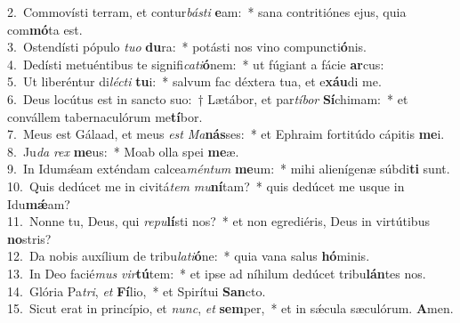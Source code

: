 {2.~}Commovísti terram, et contur\textit{bá}\textit{sti} \textbf{e}am:~* sana contritiónes ejus, quia com\textbf{mó}ta est.\\
{3.~}Ostendísti pópulo \textit{tu}\textit{o} \textbf{du}ra:~* potásti nos vino compuncti\textbf{ó}nis.\\
{4.~}Dedísti metuéntibus te signifi\textit{ca}\textit{ti}\textbf{ó}nem:~* ut fúgiant a fácie \textbf{ar}cus:\\
{5.~}Ut liberéntur di\textit{lé}\textit{cti} \textbf{tu}i:~* salvum fac déxtera tua, et e\textbf{xáu}di me.\\
{6.~}Deus locútus est in sancto suo:~† Lætábor, et par\textit{tí}\textit{bor} \textbf{Sí}chimam:~* et convállem tabernaculórum me\textbf{tí}bor.\\
{7.~}Meus est Gálaad, et meus \textit{est} \textit{Ma}\textbf{nás}ses:~* et Ephraim fortitúdo cápitis \textbf{me}i.\\
{8.~}Ju\textit{da} \textit{rex} \textbf{me}us:~* Moab olla spei \textbf{me}æ.\\
{9.~}In Idumǽam exténdam calcea\textit{mén}\textit{tum} \textbf{me}um:~* mihi alienígenæ súbdi\textbf{ti} sunt.\\
{10.~}Quis dedúcet me in civitá\textit{tem} \textit{mu}\textbf{ní}tam?~* quis dedúcet me usque in Idu\textbf{mǽ}am?\\
{11.~}Nonne tu, Deus, qui \textit{re}\textit{pu}\textbf{lí}sti nos?~* et non egrediéris, Deus in virtútibus \textbf{no}stris?\\
{12.~}Da nobis auxílium de tribu\textit{la}\textit{ti}\textbf{ó}ne:~* quia vana salus \textbf{hó}minis.\\
{13.~}In Deo facié\textit{mus} \textit{vir}\textbf{tú}tem:~* et ipse ad níhilum dedúcet tribu\textbf{lán}tes nos.\\
{14.~}Glória Pa\textit{tri}, \textit{et} \textbf{Fí}lio,~* et Spirítui \textbf{San}cto.\\
{15.~}Sicut erat in princípio, et \textit{nunc}, \textit{et} \textbf{sem}per,~* et in sǽcula sæculórum. \textbf{A}men.\\
